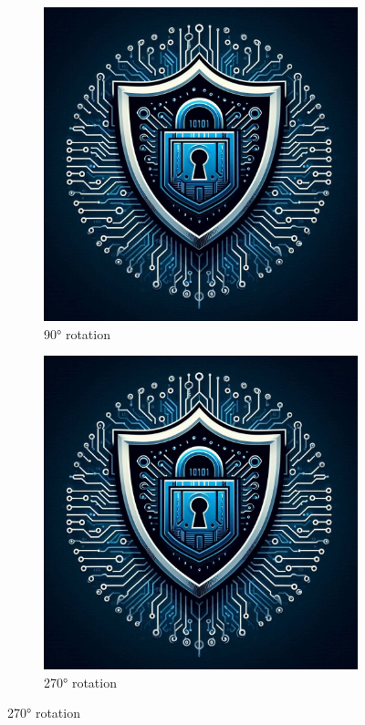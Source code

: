 \begin{figure}[htbp]
\begin{subfigure}[b]{0.3\textwidth}
        \includegraphics[width=\textwidth,angle=90]{content/images/logo.jpg}
        \caption{90° rotation}
        \label{fig:grid_90}
    \end{subfigure}
    \hfill
    \begin{subfigure}[b]{0.3\textwidth}
        \centering
        \includegraphics[width=\textwidth,angle=270]{content/images/logo.jpg}
        \caption{270° rotation}
        \label{fig:grid_270}
    \end{subfigure}


\end{figure}
